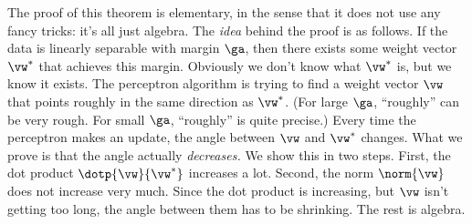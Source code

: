 The proof of this theorem is elementary, in the sense that it does not
use any fancy tricks: it's all just algebra.  The \emph{idea} behind
the proof is as follows.  If the data is linearly separable with
margin $\ga$, then there exists some weight vector $\vw^*$ that
achieves this margin.  Obviously we don't know what $\vw^*$ is, but we
know it exists.  The perceptron algorithm is trying to find a weight
vector $\vw$ that points roughly in the same direction as $\vw^*$.
(For large $\ga$, ``roughly'' can be very rough.  For small $\ga$,
``roughly'' is quite precise.)  Every time the perceptron makes an
update, the angle between $\vw$ and $\vw^*$ changes.  What we prove is
that the angle actually \emph{decreases.}  We show this in two steps.
First, the dot product $\dotp{\vw}{\vw^*}$ increases a lot.  Second,
the norm $\norm{\vw}$ does not increase very much.  Since the dot
product is increasing, but $\vw$ isn't getting too long, the angle
between them has to be shrinking.  The rest is algebra.


